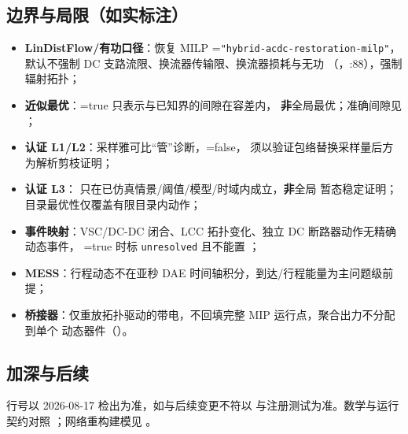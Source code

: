 \subsection{边界与局限（如实标注）}
\begin{itemize}
  \item \textbf{LinDistFlow/有功口径}：恢复 MILP =\texttt{"hybrid-acdc-restoration-milp"}，
        默认不强制 DC 支路流限、换流器传输限、换流器损耗与无功
        （，:88），强制辐射拓扑；
  \item \textbf{近似最优}：=true 只表示与已知界的间隙在容差内，
        \textbf{非}全局最优；准确间隙见 ；
  \item \textbf{认证 L1/L2}：采样雅可比“管”诊断，=false，
        须以验证包络替换采样量后方为解析剪枝证明；
  \item \textbf{认证 L3}： 只在已仿真情景/阈值/模型/时域内成立，\textbf{非}全局
        暂态稳定证明；目录最优性仅覆盖有限目录内动作；
  \item \textbf{事件映射}：VSC/DC-DC 闭合、LCC 拓扑变化、独立 DC 断路器动作无精确动态事件，
        =true 时标 \texttt{unresolved} 且不能置 ；
  \item \textbf{MESS}：行程动态不在亚秒 DAE 时间轴积分，到达/行程能量为主问题级前提；
  \item \textbf{桥接器}：仅重放拓扑驱动的带电，不回填完整 MIP 运行点，聚合出力不分配到单个
        动态器件（）。
\end{itemize}

\subsection{加深与后续}
行号以 2026-08-17 检出为准，如与后续变更不符以
 与注册测试为准。数学与运行契约对照
；网络重构建模见
。
